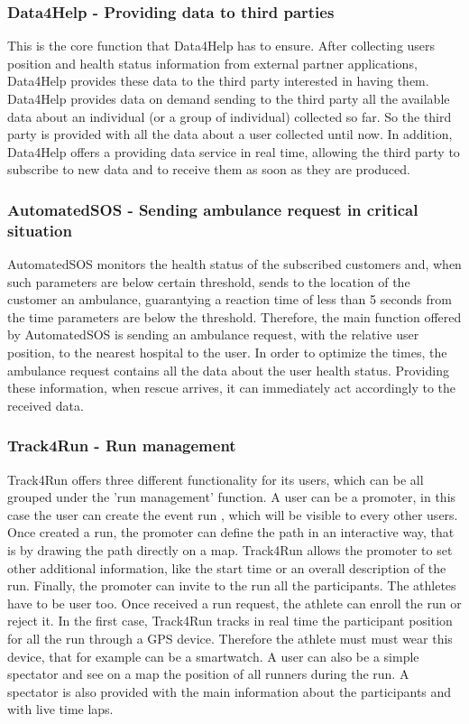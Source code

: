 \subsubsection{Data4Help - Providing data to third parties }
This is the core function that Data4Help has to ensure. After collecting users position and health status information from external partner applications, Data4Help provides these data to the third party interested in having them. Data4Help provides data on demand sending to the third party all the available data about an individual (or a group of individual) collected so far. So the third party is provided with all the data about a user collected until now. In addition, Data4Help offers a providing data service in real time, allowing the third party to subscribe to new data and to receive them as soon as they are produced.

\subsubsection{AutomatedSOS - Sending ambulance request in critical situation}
AutomatedSOS monitors the health status of the subscribed customers and, when such parameters are below certain threshold, sends to the location of the customer an ambulance, guarantying a reaction time of less than 5 seconds from the time parameters are below the threshold.
\bigbreak
\noindent
Therefore, the main function offered by AutomatedSOS is sending an ambulance request, with the relative user position, to the nearest hospital to the user. In order to optimize the times, the ambulance request contains all the data about the user health status. Providing these information, when rescue arrives, it can immediately act accordingly to the received data.
\subsubsection{Track4Run - Run management}
Track4Run offers three different functionality for its users, which can be all grouped under the 'run management' function. A user can be a promoter, in this case the user can create the event run , which will be visible to every other users. Once created a run, the promoter can define the path in an interactive way, that is by drawing the path directly on a map. Track4Run allows the promoter to set other additional information, like the start time or an overall description of the run. Finally, the promoter can invite to the run all the participants. 
\bigbreak
\noindent
The athletes have to be user too. Once received a run request, the athlete can enroll the run or reject it. In the first case, Track4Run tracks in real time the participant position for all the run through a GPS device. Therefore the athlete must must wear this device, that for example can be a smartwatch.
\bigbreak
\noindent
A user can also be a simple spectator and see on a map the position of all runners during the run. A spectator is also provided with the main information about the participants and with live time laps.

